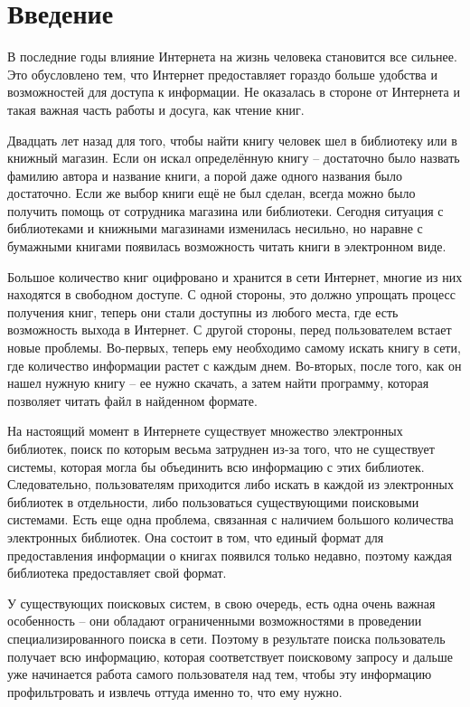 
\section{Введение}
В последние годы влияние Интернета на жизнь человека становится все сильнее. Это обусловлено тем, что Интернет предоставляет гораздо больше удобства и возможностей для доступа к информации. Не оказалась в стороне от Интернета и такая важная часть работы и досуга, как чтение книг.

Двадцать лет назад для того, чтобы найти книгу человек шел в библиотеку или в книжный магазин. Если он искал определённую книгу -- достаточно было назвать фамилию автора и название книги, а порой даже одного названия было достаточно. Если же выбор книги ещё не был сделан, всегда можно было получить помощь от сотрудника магазина или библиотеки. Сегодня ситуация с библиотеками и книжными магазинами изменилась несильно, но наравне с бумажными книгами появилась возможность читать книги в электронном виде. 

Большое количество книг оцифровано и хранится в сети Интернет, многие из них находятся в свободном доступе. С одной стороны, это должно упрощать процесс получения книг, \tk теперь они стали доступны из любого места, где есть возможность выхода в Интернет. С другой стороны, перед пользователем встает новые проблемы. Во-первых, теперь ему необходимо самому искать книгу в сети, где количество информации растет с каждым днем. Во-вторых, после того, как он нашел нужную книгу -- ее нужно скачать, а затем найти программу, которая позволяет читать файл в найденном формате. 

На настоящий момент в Интернете существует множество электронных библиотек, поиск по которым весьма затруднен из-за того, что не существует системы, которая могла бы объединить всю информацию с этих библиотек. Следовательно, пользователям приходится либо искать в каждой из электронных библиотек в отдельности, либо пользоваться существующими поисковыми системами. Есть еще одна проблема, связанная с наличием большого количества электронных библиотек. Она состоит в том, что единый формат для предоставления информации о книгах появился только недавно, поэтому каждая библиотека предоставляет свой формат.

У существующих поисковых систем, в свою очередь,  есть одна очень важная особенность -- они обладают ограниченными возможностями в проведении специализированного поиска в сети. Поэтому в результате поиска пользователь получает всю информацию, которая соответствует поисковому запросу и дальше уже начинается работа самого пользователя над тем, чтобы эту информацию профильтровать и извлечь оттуда именно то, что ему нужно. 

